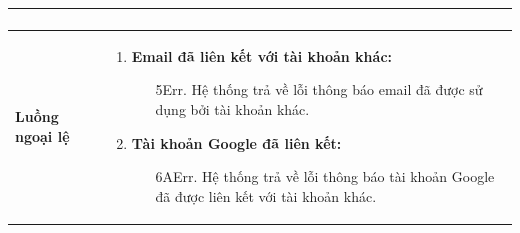 {\begin{tabularx}{\textwidth}{|>{\raggedright\arraybackslash}X|>{\raggedright\arraybackslash}X|}
\begin{enumerate}
\end{enumerate} \\
\hline
\textbf{Luồng ngoại lệ} &
\begin{enumerate}
    \item \textbf{Email đã liên kết với tài khoản khác:}
    \begin{enumerate}
        \item[5Err.] Hệ thống trả về lỗi thông báo email đã được sử dụng bởi tài khoản khác.
    \end{enumerate}
    \item \textbf{Tài khoản Google đã liên kết:}
    \begin{enumerate}
        \item[6AErr.] Hệ thống trả về lỗi thông báo tài khoản Google đã được liên kết với tài khoản khác.
    \end{enumerate}
\end{enumerate} \\
\hline
\end{tabularx}
}
